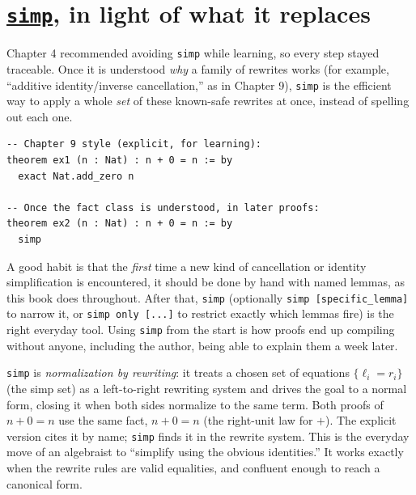 \section{\texorpdfstring{\href{https://lean-lang.org/doc/reference/latest/Tactic-Proofs/Tactic-Reference/}{\texttt{simp}}, in light of what it replaces}{simp, in light of what it replaces}}\label{sec:12-working-efficiently:03-simp:1}

Chapter 4 recommended avoiding \texttt{simp} while learning, so every step stayed traceable. Once it is understood \emph{why} a family of rewrites works (for example, ``additive identity/inverse cancellation,'' as in Chapter 9), \texttt{simp} is the efficient way to apply a whole \emph{set} of these known-safe rewrites at once, instead of spelling out each one.

\begin{lstlisting}
-- Chapter 9 style (explicit, for learning):
theorem ex1 (n : Nat) : n + 0 = n := by
  exact Nat.add_zero n

-- Once the fact class is understood, in later proofs:
theorem ex2 (n : Nat) : n + 0 = n := by
  simp
\end{lstlisting}

A good habit is that the \emph{first} time a new kind of cancellation or identity simplification is encountered, it should be done by hand with named lemmas, as this book does throughout. After that, \texttt{simp} (optionally \texttt{simp [specific\_\allowbreak{}lemma]} to narrow it, or \texttt{simp only [...]} to restrict exactly which lemmas fire) is the right everyday tool. Using \texttt{simp} from the start is how proofs end up compiling without anyone, including the author, being able to explain them a week later.

\begin{mathreading}

\texttt{simp} is \emph{normalization by rewriting}: it treats a chosen set of equations \(\{\ell_i = r_i\}\) (the simp set) as a left-to-right rewriting system and drives the goal to a normal form, closing it when both sides normalize to the same term. Both proofs of \(n + 0 = n\) use the same fact, \(n + 0 = n\) (the right-unit law for \(+\)). The explicit version cites it by name; \texttt{simp} finds it in the rewrite system. This is the everyday move of an algebraist to ``simplify using the obvious identities.'' It works exactly when the rewrite rules are valid equalities, and confluent enough to reach a canonical form.

\end{mathreading}
